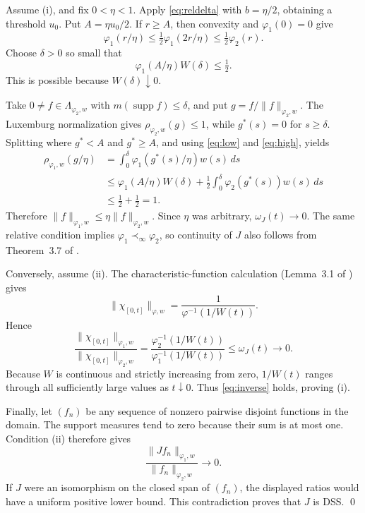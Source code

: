 \documentclass[11pt]{article}
\newcommand{\Lam}{\Lambda}
\newcommand{\supp}{\operatorname{supp}}
\newcommand{\meas}{m}
\begin{document}
Assume (i), and fix $0<\eta<1$.  Apply \eqref{eq:reldelta} with
$b=\eta/2$, obtaining a threshold $u_0$.  Put $A=\eta u_0/2$.  If $r\geq A$,
then convexity and $\varphi_1(0)=0$ give
\begin{equation}\label{eq:high}
 \varphi_1(r/\eta)
 \leq \tfrac12\varphi_1(2r/\eta)
 \leq \tfrac12\varphi_2(r).
\end{equation}
Choose $\delta>0$ so small that
\begin{equation}\label{eq:low}
 \varphi_1(A/\eta)W(\delta)\leq\tfrac12.
\end{equation}
This is possible because $W(\delta)\downarrow0$.

Take $0\neq f\in\Lam_{\varphi_2,w}$ with
$\meas(\supp f)\leq\delta$, and put
$g=f/\|f\|_{\varphi_2,w}$.  The Luxemburg normalization gives
$\rho_{\varphi_2,w}(g)\leq1$, while $g^*(s)=0$ for $s\geq\delta$.  Splitting
where $g^*<A$ and $g^*\geq A$, and using \eqref{eq:low} and
\eqref{eq:high}, yields
\begin{align*}
 \rho_{\varphi_1,w}(g/\eta)
 &=\int_0^\delta\varphi_1(g^*(s)/\eta)w(s)\,ds\\
 &\leq \varphi_1(A/\eta)W(\delta)
 +\tfrac12\int_0^\delta\varphi_2(g^*(s))w(s)\,ds\\
 &\leq \tfrac12+\tfrac12=1.
\end{align*}
Therefore $\|f\|_{\varphi_1,w}\leq
\eta\|f\|_{\varphi_2,w}$.  Since $\eta$ was arbitrary,
$\omega_J(t)\to0$.  The same relative condition implies
$\varphi_1\prec_\infty\varphi_2$, so continuity of $J$ also follows from
Theorem~3.7 of \cite{source}.

Conversely, assume (ii).  The characteristic-function calculation (Lemma~3.1
of \cite{source}) gives
\[
 \|\chi_{[0,t]}\|_{\varphi,w}
 =\frac{1}{\varphi^{-1}(1/W(t))}.
\]
Hence
\[
 \frac{\|\chi_{[0,t]}\|_{\varphi_1,w}}
      {\|\chi_{[0,t]}\|_{\varphi_2,w}}
 =\frac{\varphi_2^{-1}(1/W(t))}
       {\varphi_1^{-1}(1/W(t))}
 \leq\omega_J(t)\longrightarrow0.
\]
Because $W$ is continuous and strictly increasing from zero, $1/W(t)$ ranges
through all sufficiently large values as $t\downarrow0$.  Thus
\eqref{eq:inverse} holds, proving (i).

Finally, let $(f_n)$ be any sequence of nonzero pairwise disjoint functions in
the domain.  The support measures tend to zero because their sum is at most
one.  Condition (ii) therefore gives
\[
 \frac{\|Jf_n\|_{\varphi_1,w}}{\|f_n\|_{\varphi_2,w}}\longrightarrow0.
\]
If $J$ were an isomorphism on the closed span of $(f_n)$, the displayed ratios
would have a uniform positive lower bound.  This contradiction proves that
$J$ is DSS. \qed
\end{document}
